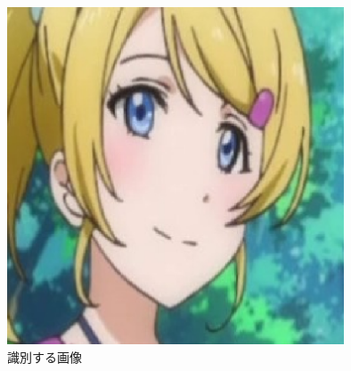 \documentclass[a4paper,10pt]{jsarticle}
\begin{document}
\begin{figure}[tb]
 \begin{center}
  \includegraphics[clip,width=10cm]{./fig/eps/eri.eps}
 \end{center}
 \caption{識別する画像}
 \label{eri}
\end{figure}
\end{document}
